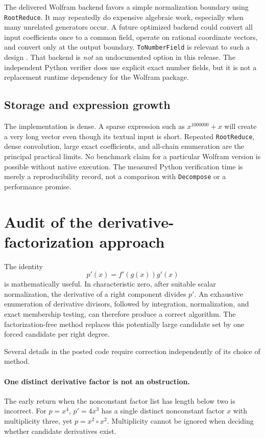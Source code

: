 \documentclass[11pt,a4paper]{article}
\numberwithin{equation}{section}
\theoremstyle{definition}
\theoremstyle{remark}
\newcommand{\code}[1]{\texttt{#1}}
\begin{document}
The delivered Wolfram backend favors a simple normalization boundary using
\code{RootReduce}. It may repeatedly do expensive algebraic work, especially
when many unrelated generators occur. A future optimized backend could
convert all input coefficients once to a common field, operate on rational
coordinate vectors, and convert only at the output boundary.
\code{ToNumberField} is relevant to such a design \cite{ToNumberField}.
That backend is \emph{not} an undocumented option in this release. The
independent Python verifier does use explicit exact number fields, but it is
not a replacement runtime dependency for the Wolfram package.

\subsection{Storage and expression growth}
The implementation is dense. A sparse expression such as $x^{1000000}+x$
will create a very long vector even though its textual input is short.
Repeated \code{RootReduce}, dense convolution, large exact coefficients,
and all-chain enumeration are the principal practical limits. No benchmark
claim for a particular Wolfram version is possible without native execution.
The measured Python verification time is merely a reproducibility record,
not a comparison with \code{Decompose} or a performance promise.

\section{Audit of the derivative-factorization approach}
\label{sec:audit}
The identity
\[
 p'(x)=f'(g(x))g'(x)
\]
is mathematically useful. In characteristic zero, after suitable scalar
normalization, the derivative of a right component divides $p'$. An exhaustive
enumeration of derivative divisors, followed by integration, normalization,
and exact membership testing, can therefore produce a correct algorithm.
The factorization-free method replaces this potentially large candidate set
by one forced candidate per right degree.

Several details in the posted code require correction independently of its
choice of method.

\paragraph{One distinct derivative factor is not an obstruction.}
The early return when the nonconstant factor list has length below two is
incorrect. For $p=x^4$, $p'=4x^3$ has a single distinct nonconstant factor
$x$ with multiplicity three, yet $p=x^2\circ x^2$. Multiplicity cannot be
ignored when deciding whether candidate derivatives exist.
\end{document}
